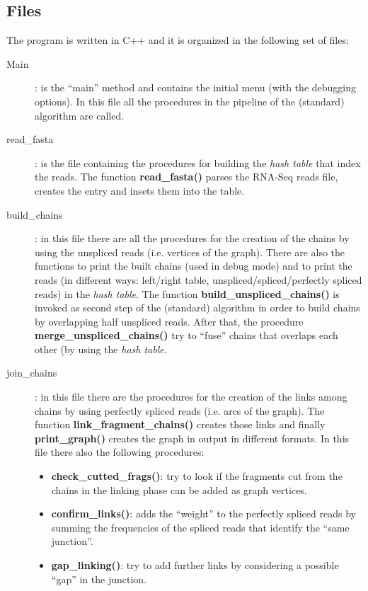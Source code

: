 \documentclass[11pt]{article}
\begin{document}
\subsection*{Files}
The program is written in C++ and it is organized in the following set of files:
\begin{description}
\item[Main]: is the ``main'' method and contains the initial
menu (with the debugging options). In this file all the procedures in
the pipeline of the (standard) algorithm are called.
\item[read\_fasta]: is the file containing the procedures for building
the \emph{hash table} that index the reads. The function
\textbf{read\_fasta()} parses the RNA-Seq reads file, creates the
entry and insets them into the table.
\item[build\_chains]: in this file there are all the procedures for
the creation of the chains by using the unspliced reads (i.e. vertices
of the graph). There are also the functions to print the built chains
(used in debug mode) and to print the reads (in different ways:
left/right table, unspliced/spliced/perfectly spliced reads) in the
\emph{hash table}. The function \textbf{build\_unspliced\_chains()} is
invoked as second step of the (standard) algorithm in order to build
chains by overlapping half unspliced reads. After that, the procedure
\textbf{merge\_unspliced\_chains()} try to ``fuse'' chains that
overlaps each other (by using the \emph{hash table}.
\item[join\_chains]: in this file there are the procedures for the
creation of the links among chains by using perfectly spliced reads
(i.e. arcs of the graph). The function
\textbf{link\_fragment\_chains()} creates those links and finally
\textbf{print\_graph()} creates the graph in output in different
formats. In this file there also the following procedures:
\begin{itemize}
\item \textbf{check\_cutted\_frags()}: try to look if the fragments
cut from the chains in the linking phase can be added as graph
vertices.
\item \textbf{confirm\_links()}: adds the ``weight'' to the perfectly
spliced reads by summing the frequencies of the spliced reads that
identify the ``same junction''.
\item \textbf{gap\_linking()}: try to add further links by considering
a possible ``gap'' in the junction.
\end{itemize}
\end{description}
\end{document}

